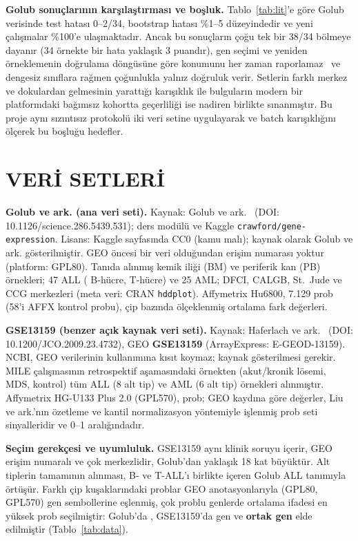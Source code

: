 \documentclass[conference]{IEEEtran}
\begin{document}
\textbf{Golub sonuçlarının karşılaştırması ve boşluk.} Tablo~\ref{tab:lit}'e göre Golub verisinde test hatası 0--2/34, bootstrap hatası \%1--5 düzeyindedir ve yeni çalışmalar \%100'e ulaşmaktadır. Ancak bu sonuçların çoğu tek bir 38/34 bölmeye dayanır (34 örnekte bir hata yaklaşık 3 puandır), gen seçimi ve yeniden örneklemenin doğrulama döngüsüne göre konumunu her zaman raporlamaz~\cite{ambroise2002} ve dengesiz sınıflara rağmen çoğunlukla yalnız doğruluk verir. Setlerin farklı merkez ve dokulardan gelmesinin yarattığı karışıklık ile bulguların modern bir platformdaki bağımsız kohortta geçerliliği ise nadiren birlikte sınanmıştır. Bu proje aynı sızıntısız protokolü iki veri setine uygulayarak ve batch karışıklığını ölçerek bu boşluğu hedefler.

\section{VERİ SETLERİ}\label{sec:data}
\textbf{Golub ve ark. (ana veri seti).} Kaynak: Golub ve ark.~\cite{golub1999} (DOI: 10.1126/science.286.5439.531); ders modülü ve Kaggle \texttt{crawford/gene-expression}. Lisans: Kaggle sayfasında CC0 (kamu malı); kaynak olarak Golub ve ark. gösterilmiştir. GEO öncesi bir veri olduğundan erişim numarası yoktur (platform: GPL80). Tanıda alınmış kemik iliği (BM) ve periferik kan (PB) örnekleri; 47 ALL (\GallBTR{} B-hücre, \GallTTR{} T-hücre) ve 25 AML; DFCI, CALGB, St.~Jude ve CCG merkezleri (meta veri: CRAN \texttt{hddplot}). Affymetrix Hu6800, 7.129 prob (58'i AFFX kontrol probu), çip bazında ölçeklenmiş ortalama fark değerleri.

\textbf{GSE13159 (benzer açık kaynak veri seti).} Kaynak: Haferlach ve ark.~\cite{haferlach2010} (DOI: 10.1200/JCO.2009.23.4732), GEO \textbf{GSE13159} (ArrayExpress: E-GEOD-13159). NCBI, GEO verilerinin kullanımına kısıt koymaz; kaynak gösterilmesi gerekir. MILE çalışmasının retrospektif aşamasındaki \StotalTR{} örnekten (akut/kronik lösemi, MDS, kontrol) tüm ALL (8 alt tip) ve AML (6 alt tip) örnekleri alınmıştır. Affymetrix HG-U133 Plus 2.0 (GPL570), \SpTR{} prob; GEO kaydına göre değerler, Liu ve ark.'nın özetleme ve kantil normalizasyon yöntemiyle işlenmiş prob seti sinyalleridir ve 0--1 aralığındadır.

\textbf{Seçim gerekçesi ve uyumluluk.} GSE13159 aynı klinik soruyu içerir, GEO erişim numaralı ve çok merkezlidir, Golub'dan yaklaşık 18 kat büyüktür. Alt tiplerin tamamının alınması, B- ve T-ALL'ı birlikte içeren Golub ALL tanımıyla örtüşür. Farklı çip kuşaklarındaki problar GEO anotasyonlarıyla (GPL80, GPL570) gen sembollerine eşlenmiş, çok problu genlerde ortalama ifadesi en yüksek prob seçilmiştir: Golub'da \SgolubGTR{}, GSE13159'da \SgseGTR{} gen ve \textbf{\ScommonGTR{} ortak gen} elde edilmiştir (Tablo~\ref{tab:data}).
\end{document}
